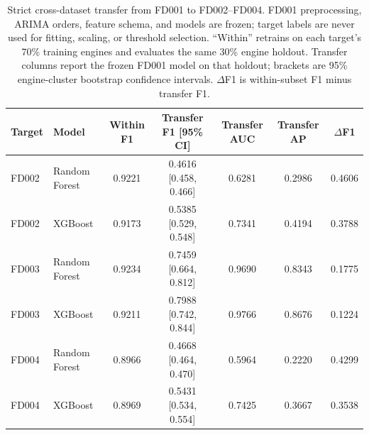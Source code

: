 \begin{table}[H]
\centering
\caption{Strict cross-dataset transfer from FD001 to FD002--FD004. FD001 preprocessing,
ARIMA orders, feature schema, and models are frozen; target labels are never used for
fitting, scaling, or threshold selection. ``Within'' retrains on each target's 70\%
training engines and evaluates the same 30\% engine holdout. Transfer columns report the
frozen FD001 model on that holdout; brackets are 95\% engine-cluster bootstrap
confidence intervals. $\Delta$F1 is within-subset F1 minus transfer F1.}
\label{tab:iot-transfer}
\footnotesize
\setlength{\tabcolsep}{3pt}
\begin{tabular}{llccccc}
\toprule
Target & Model & Within F1 & Transfer F1 [95\% CI] & Transfer AUC & Transfer AP & $\Delta$F1 \\
\midrule
FD002 & Random Forest & 0.9221 & 0.4616 [0.458, 0.466] & 0.6281 & 0.2986 & 0.4606 \\
FD002 & XGBoost & 0.9173 & 0.5385 [0.529, 0.548] & 0.7341 & 0.4194 & 0.3788 \\
FD003 & Random Forest & 0.9234 & 0.7459 [0.664, 0.812] & 0.9690 & 0.8343 & 0.1775 \\
FD003 & XGBoost & 0.9211 & 0.7988 [0.742, 0.844] & 0.9766 & 0.8676 & 0.1224 \\
FD004 & Random Forest & 0.8966 & 0.4668 [0.464, 0.470] & 0.5964 & 0.2220 & 0.4299 \\
FD004 & XGBoost & 0.8969 & 0.5431 [0.534, 0.554] & 0.7425 & 0.3667 & 0.3538 \\
\bottomrule
\end{tabular}
\end{table}
